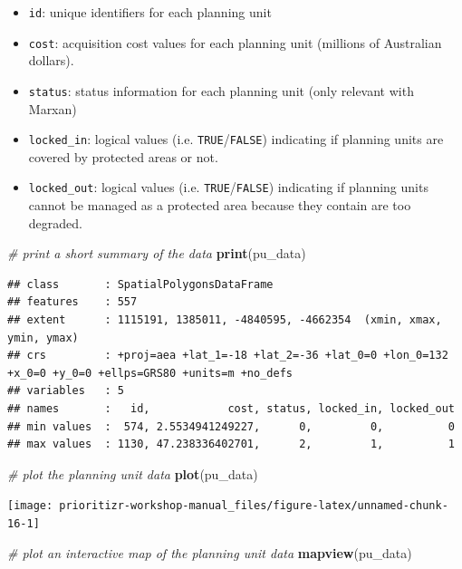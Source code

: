 \documentclass[12pt,]{book}
\newenvironment{Shaded}{\begin{snugshade}}{\end{snugshade}}
\newcommand{\KeywordTok}[1]{\textcolor[rgb]{0.13,0.29,0.53}{\textbf{#1}}}
\newcommand{\CommentTok}[1]{\textcolor[rgb]{0.56,0.35,0.01}{\textit{#1}}}
\newcommand{\NormalTok}[1]{#1}
\providecommand{\tightlist}{%
  \setlength{\itemsep}{0pt}\setlength{\parskip}{0pt}}
\begin{document}
\begin{itemize}
\tightlist
\item
  \texttt{id}: unique identifiers for each planning unit
\item
  \texttt{cost}: acquisition cost values for each planning unit
  (millions of Australian dollars).
\item
  \texttt{status}: status information for each planning unit (only
  relevant with Marxan)
\item
  \texttt{locked\_in}: logical values (i.e.
  \texttt{TRUE}/\texttt{FALSE}) indicating if planning units are covered
  by protected areas or not.
\item
  \texttt{locked\_out}: logical values (i.e.
  \texttt{TRUE}/\texttt{FALSE}) indicating if planning units cannot be
  managed as a protected area because they contain are too degraded.
\end{itemize}

\begin{Shaded}
\begin{Highlighting}[]
\CommentTok{# print a short summary of the data}
\KeywordTok{print}\NormalTok{(pu_data)}
\end{Highlighting}
\end{Shaded}

\begin{verbatim}
## class       : SpatialPolygonsDataFrame 
## features    : 557 
## extent      : 1115191, 1385011, -4840595, -4662354  (xmin, xmax, ymin, ymax)
## crs         : +proj=aea +lat_1=-18 +lat_2=-36 +lat_0=0 +lon_0=132 +x_0=0 +y_0=0 +ellps=GRS80 +units=m +no_defs 
## variables   : 5
## names       :   id,            cost, status, locked_in, locked_out 
## min values  :  574, 2.5534941249227,      0,         0,          0 
## max values  : 1130, 47.238336402701,      2,         1,          1
\end{verbatim}

\begin{Shaded}
\begin{Highlighting}[]
\CommentTok{# plot the planning unit data}
\KeywordTok{plot}\NormalTok{(pu_data)}
\end{Highlighting}
\end{Shaded}

\begin{center}\texttt{[image: prioritizr-workshop-manual\_files/figure-latex/unnamed-chunk-16-1]} \end{center}

\begin{Shaded}
\begin{Highlighting}[]
\CommentTok{# plot an interactive map of the planning unit data}
\KeywordTok{mapview}\NormalTok{(pu_data)}
\end{Highlighting}
\end{Shaded}
\end{document}

